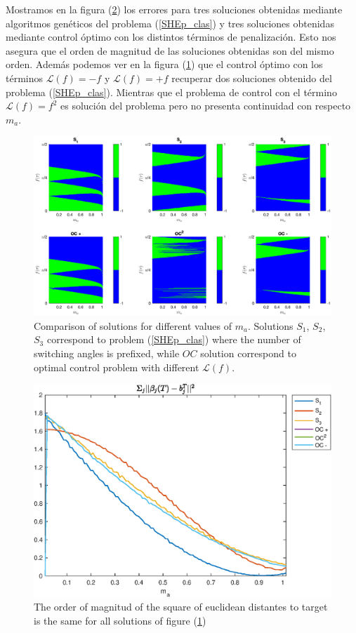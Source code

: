 Mostramos en la figura (\ref{fig:error_solutions}) los errores para tres soluciones obtenidas mediante algoritmos genéticos del problema (\ref{SHEp_clas}) y tres soluciones obtenidas mediante control óptimo con los distintos términos de penalización.  Esto nos asegura que el orden de magnitud de las soluciones obtenidas son del mismo orden. Además podemos ver en la figura (\ref{fig:solutions}) que el control óptimo con los términos $\mathcal{L}(f) = -f$ y $\mathcal{L}(f) = +f$ recuperar dos soluciones obtenido del problema (\ref{SHEp_clas}). Mientras que el problema de control con el término $\mathcal{L}(f) = f^2$ es solución del problema pero no presenta continuidad con respecto $m_a$.
 
\begin{figure}[!ht] 
        \centering
        \includegraphics[scale=0.5]{img/EX01_surf.eps}
        \caption{Comparison of solutions for different values of $m_a$. Solutions $S_1$, $S_2$, $S_3$ correspond to problem (\ref{SHEp_clas}) where the number of switching angles is prefixed, while $OC$ solution correspond to optimal control problem with different $\mathcal{L}(f)$. }
        \label{fig:solutions}
    \end{figure}


 
\begin{figure}
    \centering
    \includegraphics[scale=0.6]{img/EX01.eps}
    \caption{The order of magnitud of the square of euclidean distantes to target is the same for all solutions of figure (\ref{fig:solutions})}
    \label{fig:error_solutions}
\end{figure}

